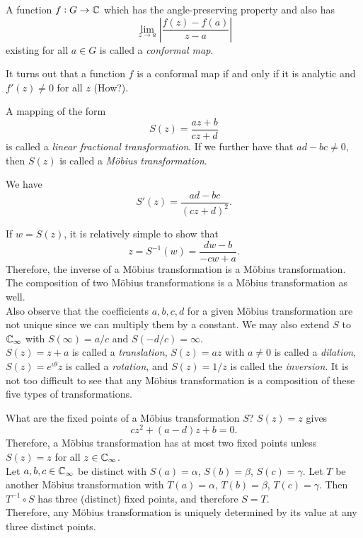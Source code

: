 	\begin{fdef}
		A function $f : G \to \mathbb{C}$ which has the angle-preserving property and also has 
		\[ \lim_{z\to a} \left|\frac{f(z)-f(a)}{z-a}\right| \]
		existing for all $a \in G$ is called a \emph{conformal map}.
	\end{fdef}

	It turns out that a function $f$ is a conformal map if and only if it is analytic and $f'(z) \ne 0$ for all $z$ (How?).

	\begin{fdef}
		A mapping of the form
		\[ S(z) = \frac{az+b}{cz+d} \]
		is called a \emph{linear fractional transformation}. If we further have that $ad-bc \ne 0$, then $S(z)$ is called a \emph{M\"{o}bius transformation}.
	\end{fdef}

	We have
	\[ S'(z) = \frac{ad-bc}{(cz+d)^2}. \]

	If $w = S(z)$, it is relatively simple to show that
	\[ z = S^{-1}(w) = \frac{dw-b}{-cw+a}. \]
	Therefore, the inverse of a M\"{o}bius transformation is a M\"{o}bius transformation. The composition of two M\"{o}bius transformations is a M\"{o}bius transformation as well.\\
	Also observe that the coefficients $a,b,c,d$ for a given M\"{o}bius transformation are not unique since we can multiply them by a constant. We may also extend $S$ to $\mathbb{C}_\infty$ with $S(\infty) = a/c$ and $S(-d/c) = \infty$.\\

	$S(z) = z+a$ is called a \emph{translation}, $S(z) = az$ with $a\ne 0$ is called a \emph{dilation}, $S(z) = e^{\iota\theta} z$ is called a \emph{rotation}, and $S(z) = 1/z$ is called the \emph{inversion}. It is not too difficult to see that any M\"{o}bius transformation is a composition of these five types of transformations.

	What are the fixed points of a M\"{o}bius transformation $S$? $S(z) = z$ gives
	\[ cz^2 + (a-d)z + b = 0. \]
	Therefore, a M\"{o}bius transformation has at most two fixed points unless $S(z) = z$ for all $z \in \mathbb{C}_\infty$.\\

	Let $a,b,c\in\mathbb{C}_\infty$ be distinct with $S(a) = \alpha$, $S(b) = \beta$, $S(c) = \gamma$. Let $T$ be another M\"{o}bius transformation with $T(a) = \alpha$, $T(b) = \beta$, $T(c) = \gamma$. Then $T^{-1} \circ S$ has three (distinct) fixed points, and therefore $S = T$.\\
	Therefore, any M\"{o}bius transformation is uniquely determined by its value at any three distinct points.\\

